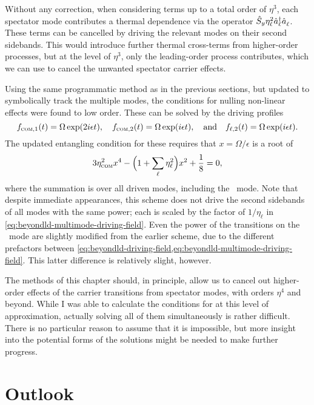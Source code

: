 Without any correction, when considering terms up to a total order of $\eta^3$, each spectator mode contributes a thermal dependence via the operator $\hat{S}_y\eta_\ell^2\hat{a}^{\smash\dagger}_\ell\hat{a}^{}_\ell$.
These terms can be cancelled by driving the relevant modes on their second sidebands.
This would introduce further thermal cross-terms from higher-order processes, but at the level of $\eta^3$, only the leading-order process contributes, which we can use to cancel the unwanted spectator carrier effects.

Using the same programmatic method as in the previous sections, but updated to symbolically track the multiple modes, the conditions for nulling non-linear effects were found to low order.
These can be solved by the driving profiles
\begin{equation}
f_{{\textsc{com}},1}(t) = \Omega\exp(2i\epsilon t),\quad f_{{\textsc{com}},2}(t) = \Omega\exp(i\epsilon t), \quad\text{and}\quad f_{\ell,2}(t) = \Omega\exp(i\epsilon t).
\end{equation}
The updated entangling condition for these requires that $x = \Omega/\epsilon$ is a root of
\begin{equation}
3\eta_{\textsc{com}}^2x^4 - \Bigl(1 + \sum_\ell \eta^2_\ell\Bigr)x^2 + \frac18 = 0,
\end{equation}
where the summation is over all driven modes, including the \com\ mode.
Note that despite immediate appearances, this scheme does not drive the second sidebands of all modes with the same power; each is scaled by the factor of $1/\eta_\ell$ in \cref{eq:beyondld-multimode-driving-field}.
Even the power of the transitions on the \com\ mode are slightly modified from the earlier scheme, due to the different prefactors between \cref{eq:beyondld-driving-field,eq:beyondld-multimode-driving-field}.
This latter difference is relatively slight, however.

The methods of this chapter should, in principle, allow us to cancel out higher-order effects of the carrier transitions from spectator modes, with orders $\eta^4$ and beyond.
While I was able to calculate the conditions for at this level of approximation, actually solving all of them simultaneously is rather difficult.
There is no particular reason to assume that it is impossible, but more insight into the potential forms of the solutions might be needed to make further progress.


\section{Outlook}

